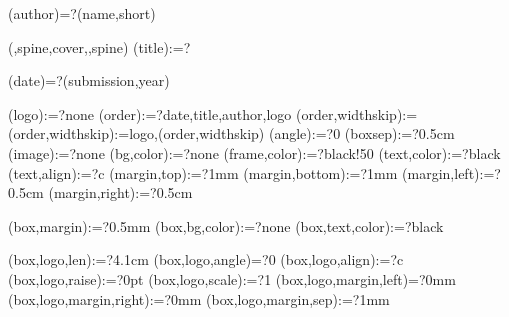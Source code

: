 
%


\makeatletter



\spine(author)=?{\thedocauthor(name,short)}

({\@LANG@COVER,spine,cover},{\@LANG@COVER,spine})%
\spine(title):=?{\match}
\AAAA

\spine(date)=?{\thentdocdate(submission,year)}


\spine(logo):=?{none}
\spine(order):=?{date,title,author,logo}
\spine(order,widthskip):={}
\spine(order,widthskip):={logo,\thespine(order,widthskip)}
\spine(angle):=?{0}
\spine(boxsep):=?{0.5cm}
\spine(image):=?{none}
\spine(bg,color):=?{none}
\spine(frame,color):=?{black!50}
\spine(text,color):=?{black}
\spine(text,align):=?{c}
\spine(margin,top):=?{1mm}
\spine(margin,bottom):=?{1mm}
\spine(margin,left):=?{0.5cm}
\spine(margin,right):=?{0.5cm}

\spine(box,margin):=?{0.5mm}
\spine(box,bg,color):=?{none}
\spine(box,text,color):=?{black}

\spine(box,logo,len):=?{4.1cm}
\spine(box,logo,angle)=?{0}
\spine(box,logo,align):=?{c}
\spine(box,logo,raise):=?{0pt}
\spine(box,logo,scale):=?{1}
\spine(box,logo,margin,left)=?{0mm}
\spine(box,logo,margin,right):=?{0mm}
\spine(box,logo,margin,sep):=?{1mm}

